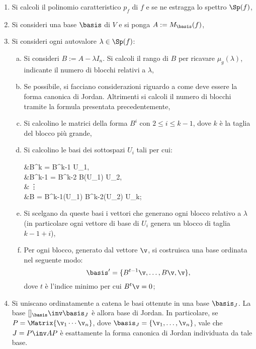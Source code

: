 \documentclass[10pt,landscape]{article}
\begin{document}
\begin{multicols}{3}
		\begin{enumerate}
			\item Si calcoli il polinomio caratteristico $p_f$ di $f$ e se
			ne estragga lo spettro $\Sp(f)$,
			\item Si consideri una base $\basis$ di $V$ e si ponga
			$A := M_\basis(f)$,
			\item Si consideri ogni autovalore $\lambda \in \Sp(f)$:
				\begin{enumerate}[a.]
					\item Si consideri $B := A - \lambda I_n$. Si calcoli
					il rango di $B$ per ricavare $\mu_g(\lambda)$, indicante
					il numero di blocchi relativi a $\lambda$,
					\item Se possibile, si facciano considerazioni riguardo
					a come deve essere la forma canonica di Jordan. Altrimenti
					si calcoli il numero di blocchi tramite la formula
					presentata precedentemente,
					\item Si calcolino le matrici della forma $B^i$ con $2 \leq i \leq k-1$,
					dove $k$ è la taglia del blocco più grande,
					\item Si calcolino le basi dei sottospazi $U_i$ tali per cui:
					\begin{flalign*}
						&\Ker B^k = \Ker B^{k-1} \oplus U_1, \\
						&\Ker B^{k-1} = \Ker B^{k-2} \oplus B(U_1) \oplus U_2, \\
						&\,\vdots \\
						&\Ker B = B^{k-1}(U_1) \oplus B^{k-2}(U_2) \oplus \cdots \oplus U_k;
					\end{flalign*}
					\item Si scelgano da queste basi i vettori che generano ogni blocco
					relativo a $\lambda$ (in particolare ogni vettore di base di $U_i$ genera
					un blocco di taglia $k-1+i$),
					\item Per ogni blocco, generato dal vettore $\v$, si costruisca una base ordinata nel seguente modo:
					\[ \basis' = \{B^{t-1} \v ,\ldots , B \v, \v\}, \]
					dove $t$ è l'indice minimo per cui $B^t \v = 0$;
				\end{enumerate}
			\item Si uniscano ordinatamente a catena le basi ottenute in una base $\basis_J$. La base $[]_\basis\inv \basis_J$ è allora base di Jordan. In particolare, se
			$P = \Matrix{\v_1 \cdots \v_n}$, dove $\basis_J= \{\v_1, \ldots, \v_n\}$, vale
			che $J = P\inv A P$ è esattamente la forma canonica di Jordan individuata
			da tale base.
		\end{enumerate}
		

\end{multicols}
\end{document}
